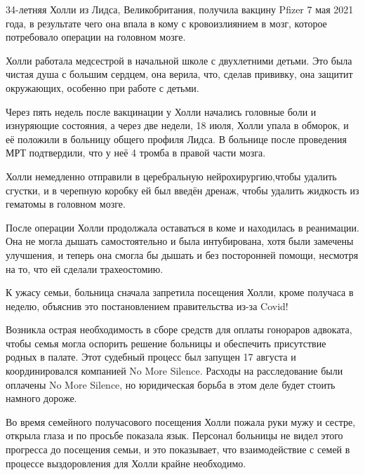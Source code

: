 34-летняя Холли из Лидса, Великобритания, получила вакцину Pfizer 7 мая 2021
года, в результате чего она впала в кому с кровоизлиянием в мозг, которое
потребовало операции на головном мозге.

Холли работала медсестрой в начальной школе с двухлетними детьми. Это была
чистая душа с большим сердцем, она верила, что, сделав прививку, она защитит
окружающих, особенно при работе с детьми.

Через пять недель после вакцинации у Холли начались головные боли и изнуряющие
состояния, а через две недели, 18 июля, Холли упала в обморок, и её положили в
больницу общего профиля Лидса. В больнице после проведения МРТ подтвердили, что
у неё 4 тромба в правой части мозга.

Холли немедленно отправили в церебральную нейрохирургию,чтобы удалить сгустки, и
в черепную коробку ей был введён дренаж, чтобы удалить жидкость из гематомы в
головном мозге.

После операции Холли продолжала оставаться в коме и находилась в реанимации. Она
не могла дышать самостоятельно и была интубирована, хотя были замечены
улучшения, и теперь она смогла бы дышать и без посторонней помощи, несмотря на
то, что ей сделали трахеостомию.

К ужасу семьи, больница сначала запретила посещения Холли, кроме получаса в
неделю, объяснив это постановлением правительства из-за Covid!

Возникла острая необходимость в сборе средств для оплаты гонораров адвоката,
чтобы семья могла оспорить решение больницы и обеспечить присутствие родных в
палате. Этот судебный процесс был запущен 17 августа и координировался компанией
No More Silence. Расходы на расследование были оплачены No More Silence, но
юридическая борьба в этом деле будет стоить намного дороже.

Во время семейного получасового посещения Холли пожала руки мужу и сестре,
открыла глаза и по просьбе показала язык. Персонал больницы не видел этого
прогресса до посещения семьи, и это показывает, что взаимодействие с семей в
процессе выздоровления для Холли крайне необходимо.
